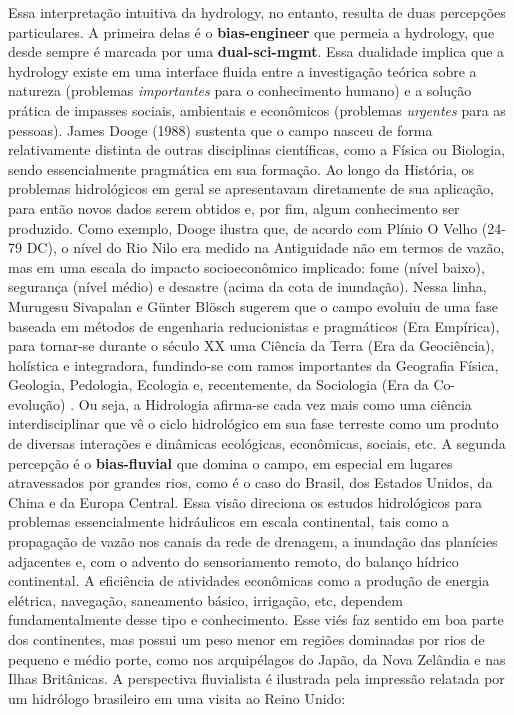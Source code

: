 \documentclass[./main.tex]{subfiles}
\begin{document}
\par Essa interpretação intuitiva da \gls{hydrology}, no entanto, resulta de duas percepções particulares. A primeira delas é o \textbf{\gls{bias-engineer}} que permeia a \gls{hydrology}, que desde sempre é marcada por uma \textbf{\gls{dual-sci-mgmt}}. Essa dualidade implica que a \gls{hydrology} existe em uma interface fluida entre a investigação teórica sobre a natureza (problemas \textit{importantes} para o conhecimento humano) e a solução prática de impasses sociais, ambientais e econômicos (problemas \textit{urgentes} para as pessoas). James Dooge (1988) \cite{Dooge1988} sustenta que o campo nasceu de forma relativamente distinta de outras disciplinas científicas, como a Física ou Biologia, sendo essencialmente pragmática em sua formação. Ao longo da História, os problemas hidrológicos em geral se apresentavam diretamente de sua aplicação, para então novos dados serem obtidos e, por fim, algum conhecimento ser produzido. Como exemplo, Dooge ilustra que, de acordo com Plínio O Velho (24-79 DC), o nível do Rio Nilo era medido na Antiguidade não em termos de vazão, mas em uma escala do impacto socioeconômico implicado: fome (nível baixo), segurança (nível médio) e desastre (acima da cota de inundação). Nessa linha, Murugesu Sivapalan e Günter Blösch sugerem que o campo evoluiu de uma fase baseada em métodos de engenharia reducionistas e pragmáticos (Era Empírica), para tornar-se durante o século XX uma Ciência da Terra (Era da Geociência), holística e integradora, fundindo-se com ramos importantes da Geografia Física, Geologia, Pedologia, Ecologia e, recentemente, da Sociologia (Era da Co-evolução) \cite{Sivapalan2017, Sivapalan2018}.  Ou seja, a Hidrologia afirma-se cada vez mais como uma ciência interdisciplinar que vê o ciclo hidrológico em sua fase terreste como um produto de diversas interações e dinâmicas ecológicas, econômicas, sociais, etc. A segunda percepção é o \textbf{\gls{bias-fluvial}} que domina o campo, em especial em lugares atravessados por grandes rios, como é o caso do Brasil, dos Estados Unidos, da China e da Europa Central. Essa visão direciona os estudos hidrológicos para problemas essencialmente hidráulicos em escala continental, tais como a propagação de vazão nos canais da rede de drenagem, a inundação das planícies adjacentes e, com o advento do sensoriamento remoto, do balanço hídrico continental. A eficiência de atividades econômicas como a produção de energia elétrica, navegação, saneamento básico, irrigação, etc, dependem fundamentalmente desse tipo e conhecimento. Esse viés faz sentido em boa parte dos continentes, mas possui um peso menor em regiões dominadas por rios de pequeno e médio porte, como nos arquipélagos do Japão, da Nova Zelândia e nas Ilhas Britânicas. A perspectiva fluvialista é ilustrada pela impressão relatada por um hidrólogo brasileiro em uma visita ao Reino Unido:
\end{document}
